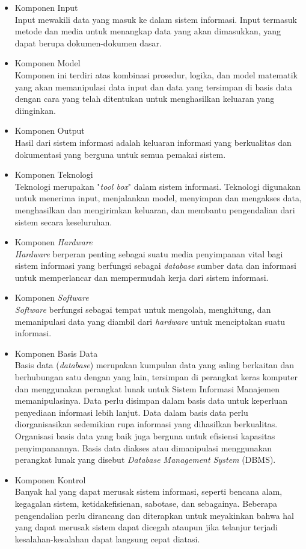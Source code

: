 \begin{itemize}
    \item Komponen Input \\
    Input mewakili data yang masuk ke dalam sistem informasi. Input termasuk metode dan media untuk menangkap data yang akan dimasukkan, yang dapat berupa dokumen-dokumen dasar.
    \item Komponen Model \\
    Komponen ini terdiri atas kombinasi prosedur, logika, dan model matematik yang akan memanipulasi data input dan data yang tersimpan di basis data dengan cara yang telah ditentukan untuk menghasilkan keluaran yang diinginkan.
    \item Komponen Output \\
    Hasil dari sistem informasi adalah keluaran informasi yang berkualitas dan dokumentasi yang berguna untuk semua pemakai sistem.
    \item Komponen Teknologi \\
    Teknologi merupakan "\emph{tool box}" dalam sistem informasi. Teknologi digunakan untuk menerima input, menjalankan model, menyimpan dan mengakses data, menghasilkan dan mengirimkan keluaran, dan membantu pengendalian dari sistem secara keseluruhan.
    \item Komponen \emph{Hardware} \\
    \emph{Hardware} berperan penting sebagai suatu media penyimpanan vital bagi sistem informasi yang berfungsi sebagai \emph{database} sumber data dan informasi untuk memperlancar dan mempermudah kerja dari sistem informasi.
    \item Komponen \emph{Software} \\
    \emph{Software} berfungsi sebagai tempat untuk mengolah, menghitung, dan memanipulasi data yang diambil dari \emph{hardware} untuk menciptakan suatu informasi.
    \item Komponen Basis Data \\
    Basis data (\emph{database}) merupakan kumpulan data yang saling berkaitan dan berhubungan satu dengan yang lain, tersimpan di perangkat keras komputer dan menggunakan perangkat lunak untuk Sistem Informasi Manajemen memanipulasinya. Data perlu disimpan dalam basis data untuk keperluan penyediaan informasi lebih lanjut. Data dalam basis data perlu diorganisasikan sedemikian rupa informasi yang dihasilkan berkualitas. Organisasi basis data yang baik juga berguna untuk efisiensi kapasitas penyimpanannya. Basis data diakses atau dimanipulasi menggunakan perangkat lunak yang disebut\emph{ Database Management System} (DBMS).
    \item Komponen Kontrol \\
    Banyak hal yang dapat merusak sistem informasi, seperti bencana alam, kegagalan sistem, ketidakefisienan, sabotase, dan sebagainya. Beberapa pengendalian perlu dirancang dan diterapkan untuk meyakinkan bahwa hal yang dapat merusak sistem dapat dicegah ataupun jika telanjur terjadi kesalahan-kesalahan dapat langsung cepat diatasi.
\end{itemize}

